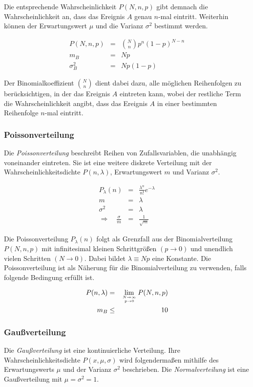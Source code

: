 \documentclass[12pt,a4paper]{scrartcl}
\numberwithin{equation}{section} %
\begin{document}
Die entsprechende  Wahrscheinlichkeit $P(N,n,p)$ gibt demnach die Wahrscheinlichkeit an, dass das Ereignis $A$ genau $n$-mal eintritt. Weiterhin können der Erwartungswert $\mu$ und die Varianz $\sigma^2$ bestimmt werden.

\begin{eqnarray}
	P(N,n,p) &=& \binom{N}{n} p^n (1-p)^{N-n} \\
	m_B &=& Np \\
	\sigma^2_B &=& N p (1-p)
\end{eqnarray}

\noindent
Der Binomialkoeffizient $\binom{N}{n}$ dient dabei dazu, alle möglichen Reihenfolgen zu berücksichtigen, in der das Ereignis $A$ eintreten kann, wobei der restliche Term die Wahrscheinlichkeit angibt, dass das Ereignis $A$ in einer bestimmten Reihenfolge $n$-mal eintritt.

\subsubsection{Poissonverteilung}
\label{Poissonverteilung}
Die \emph{Poissonverteilung} beschreibt Reihen von Zufallsvariablen, die unabhängig voneinander eintreten. Sie ist eine weitere diskrete Verteilung mit der Wahrscheinlichkeitsdichte $P(n,\lambda)$, Erwartungswert $m$ und Varianz $\sigma^2$.

\begin{eqnarray}
	P_\lambda(n) &=& \frac{\lambda^n}{n!} e^{-\lambda}
	\label{eq:poisson} \\
	m &=& \lambda\\
	\sigma^2 &=& \lambda \\
	\Rightarrow\quad \frac{\sigma}{m} &=&\frac{1}{\sqrt{m}} \label{eq:Poisson STD/EW}
\end{eqnarray}

\noindent
Die Poissonverteilung $P_\lambda(n)$ folgt als Grenzfall aus der Binomialverteilung $P(N, n, p)$ mit infinitesimal kleinen Schrittgrößen $(p\rightarrow 0)$ und unendlich vielen Schritten $(N\rightarrow 0)$. Dabei bildet $\lambda\equiv Np$ eine Konstante. Die Poissonverteilung ist als Näherung für die Binomialverteilung zu verwenden, falls folgende Bedingung erfüllt ist.

\begin{eqnarray}
	P(n, \lambda)  &=& \lim_{N \rightarrow \infty \atop p\rightarrow 0} P(N, n, p) \\
	m_B &\leq& 10
\end{eqnarray}

\subsubsection{Gaußverteilung}
\label{Gaußverteilung}
Die \emph{Gaußverteilung} ist eine kontinuierliche Verteilung. Ihre Wahrscheinlichkeitsdichte $P(x,\mu,\sigma)$ wird folgendermaßen mithilfe des Erwartungswerts $\mu$ und der Varianz $\sigma^2$ beschrieben. Die \emph{Normalverteilung}  ist eine Gaußverteilung mit $\mu=\sigma^2=1$.
\end{document}
